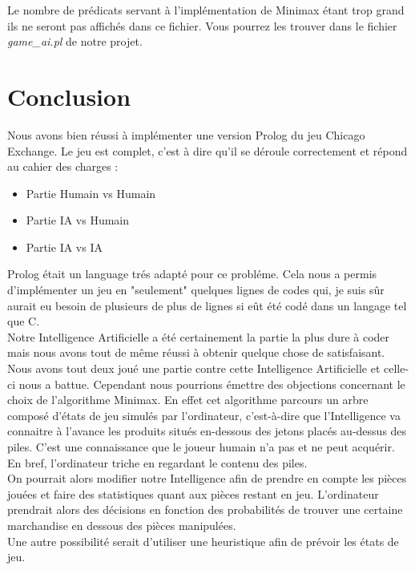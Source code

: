 \documentclass[a4paper, 11pt,twoside, leqno]{report}
\theoremstyle{plain}
\begin{document}
Le nombre de prédicats servant à l'implémentation de Minimax étant trop grand ils ne seront pas affichés dans ce fichier. Vous pourrez les trouver dans le fichier \textit{game\_{}ai.pl} de notre projet.


\chapter{Conclusion}
Nous avons bien réussi à implémenter une version Prolog du jeu Chicago Exchange. Le jeu est complet, c'est à dire qu'il se déroule correctement et répond au cahier des charges :
\begin{itemize}
   \item Partie Humain vs Humain
   \item Partie IA vs Humain
   \item Partie IA vs IA
\end{itemize}
Prolog était un language trés adapté pour ce probléme. Cela nous a permis d'implémenter un jeu en "seulement" quelques lignes de codes qui, je suis sûr aurait eu besoin de plusieurs de plus de lignes si eût été codé dans un langage tel que C.\\
Notre Intelligence Artificielle a été certainement la partie la plus dure à coder mais nous avons tout de même réussi à obtenir quelque chose de satisfaisant. Nous avons tout deux joué une partie contre cette Intelligence Artificielle et celle-ci nous a battue. Cependant nous pourrions émettre des objections concernant le choix de l'algorithme Minimax. En effet cet algorithme parcours un arbre composé d'états de jeu simulés par l'ordinateur, c'est-à-dire que l'Intelligence va connaitre à l'avance les produits situés en-dessous des jetons placés au-dessus des piles. C'est une connaissance que le joueur humain n'a pas et ne peut acquérir. En bref, l'ordinateur triche en regardant le contenu des piles.\\
On pourrait alors modifier notre Intelligence afin de prendre en compte les pièces jouées et faire des statistiques quant aux pièces restant en jeu. L'ordinateur prendrait alors des décisions en fonction des probabilités de trouver une certaine marchandise en dessous des pièces manipulées.\\
Une autre possibilité serait d'utiliser une heuristique afin de prévoir les états de jeu.
     
\end{document}
